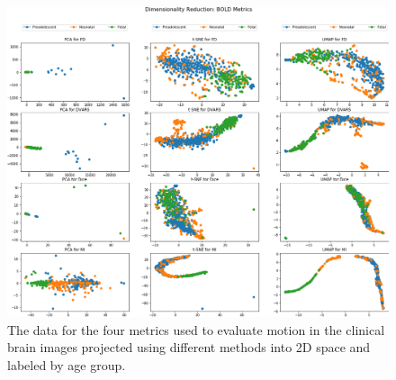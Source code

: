 \begin{figure}
\centering
\includegraphics[width=1.0\textwidth]{6/figures/bold-2d-all-agegroup.png}
\caption{The data for the four metrics used to evaluate motion in the clinical brain images projected using different methods into 2D space and labeled by age group.}
\label{fig:mocha-ages-data-2d}
\end{figure}

